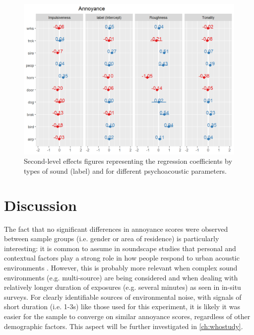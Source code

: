 \begin{figure}[h]
  \label{fig:annoyance-effects}
  \centering
  \includegraphics[width=\textwidth]{Figures/OrganMLMAnnoyanceRandom.png}
  \caption{Second-level effects figures representing the regression coefficients by types of sound (label) and for different psychoacoustic parameters.}
\end{figure}


\section{Discussion}

The fact that no significant differences in annoyance scores were observed between sample groups (i.e. gender or area of residence) is particularly interesting: it is common to assume in soundscape studies that personal and contextual factors play a strong role in how people respond to urban acoustic environments \citep{Kang2016Ten}. However, this is probably more relevant when complex sound environments (e.g. multi-source) are being considered and when dealing with relatively longer duration of exposures (e.g. several minutes) as seen in in-situ surveys. For clearly identifiable sources of environmental noise, with signals of short duration (i.e. 1-3s) like those used for this experiment, it is likely it was easier for the sample to converge on similar annoyance scores, regardless of other demographic factors. This aspect will be further investigated in \cref{ch:whostudy}.

